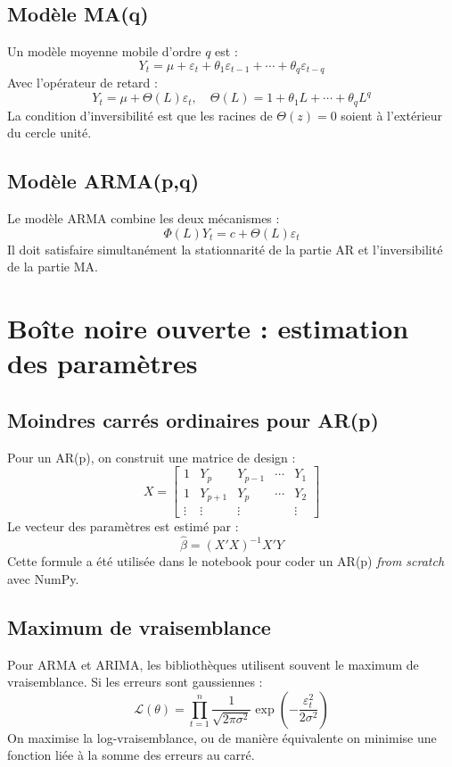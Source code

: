 \documentclass[12pt,a4paper]{report}
\begin{document}
\subsection{Modèle MA(q)}
Un modèle moyenne mobile d'ordre $q$ est :
\[
Y_t = \mu + \varepsilon_t + \theta_1\varepsilon_{t-1} + \cdots + \theta_q\varepsilon_{t-q}
\]
Avec l'opérateur de retard :
\[
Y_t = \mu + \Theta(L)\varepsilon_t, \quad \Theta(L)=1+\theta_1L+\cdots+\theta_qL^q
\]
La condition d'inversibilité est que les racines de $\Theta(z)=0$ soient à l'extérieur du cercle unité.

\subsection{Modèle ARMA(p,q)}
Le modèle ARMA combine les deux mécanismes :
\[
\Phi(L)Y_t = c + \Theta(L)\varepsilon_t
\]
Il doit satisfaire simultanément la stationnarité de la partie AR et l'inversibilité de la partie MA.

\section{Boîte noire ouverte : estimation des paramètres}
\subsection{Moindres carrés ordinaires pour AR(p)}
Pour un AR(p), on construit une matrice de design :
\[
X = \begin{bmatrix}
1 & Y_p & Y_{p-1} & \cdots & Y_1 \\
1 & Y_{p+1} & Y_p & \cdots & Y_2 \\
\vdots & \vdots & \vdots & & \vdots
\end{bmatrix}
\]
Le vecteur des paramètres est estimé par :
\[
\hat{\beta} = (X'X)^{-1}X'Y
\]
Cette formule a été utilisée dans le notebook pour coder un AR(p) \textit{from scratch} avec NumPy.

\subsection{Maximum de vraisemblance}
Pour ARMA et ARIMA, les bibliothèques utilisent souvent le maximum de vraisemblance. Si les erreurs sont gaussiennes :
\[
\mathcal{L}(\theta) = \prod_{t=1}^n \frac{1}{\sqrt{2\pi\sigma^2}}\exp\left(-\frac{\varepsilon_t^2}{2\sigma^2}\right)
\]
On maximise la log-vraisemblance, ou de manière équivalente on minimise une fonction liée à la somme des erreurs au carré.
\end{document}
